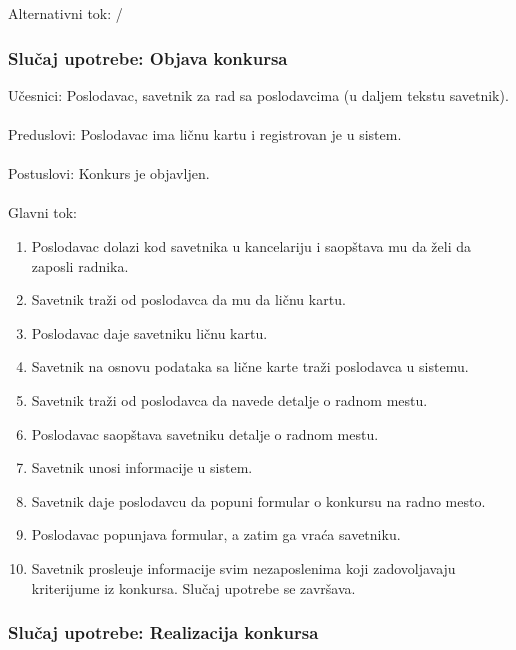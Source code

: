 \noindent Alternativni tok: /

\subsubsection{Slu\v caj upotrebe: Objava konkursa}
\label{su: razgovor sa poslodavcem}

\noindent U\v cesnici: Poslodavac, savetnik za rad sa poslodavcima (u daljem tekstu savetnik).
\\
\\ Preduslovi: Poslodavac ima li\v cnu kartu i registrovan je u sistem.
\\
\\ Postuslovi: Konkurs je objavljen.
\\
\\ Glavni tok:
\begin{enumerate}
\item Poslodavac dolazi kod savetnika u kancelariju i saop\v stava mu da \v zeli da zaposli radnika.
\item Savetnik tra\v zi od poslodavca da mu da li\v cnu kartu.
\item Poslodavac daje savetniku li\v cnu kartu.
\item Savetnik na osnovu podataka sa li\v cne karte tra\v zi poslodavca u sistemu.
\item Savetnik tra\v zi od poslodavca da navede detalje o radnom mestu.
\item Poslodavac saop\v stava savetniku detalje o radnom mestu.
\item Savetnik unosi informacije u sistem.
\item Savetnik daje poslodavcu da popuni formular o konkursu na radno mesto.
\item Poslodavac popunjava formular, a zatim ga vra\' ca savetniku.
\item Savetnik prosle\dj uje informacije svim nezaposlenima koji zadovoljavaju kriterijume iz konkursa. Slu\v caj upotrebe se zavr\v sava.
\end{enumerate}

\subsubsection{Slu\v caj upotrebe: Realizacija konkursa}

